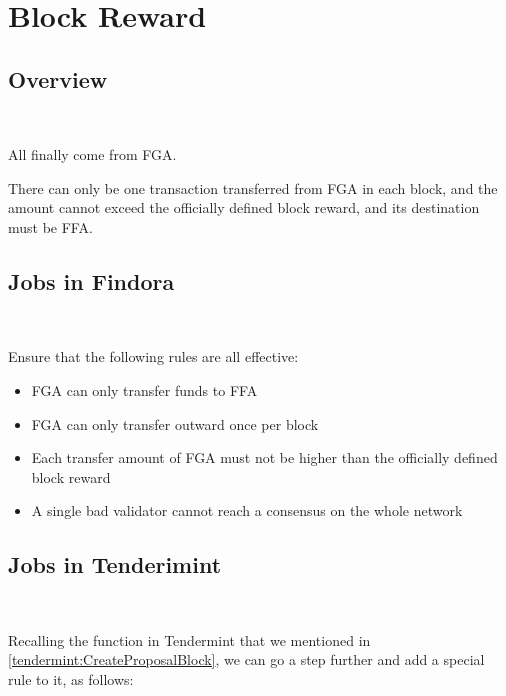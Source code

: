 \section{Block Reward} \label{section:reward}

\subsection{Overview}

~\par

All  finally come from FGA.

There can only be one transaction transferred from FGA in each block,
and the amount cannot exceed the officially defined block reward,
and its destination must be FFA.

\clearpage

\subsection{Jobs in Findora}

~\par

Ensure that the following rules are all effective:

\begin{itemize}
    \item FGA can only transfer funds to FFA
    \item FGA can only transfer outward once per block
    \item Each transfer amount of FGA must not be higher than the officially defined block reward
    \item A single bad validator cannot reach a consensus on the whole network
\end{itemize}

\subsection{Jobs in Tenderimint}

~\par

Recalling the  function in Tendermint that we mentioned in \ref{tendermint:CreateProposalBlock},
we can go a step further and add a special rule to it, as follows:


